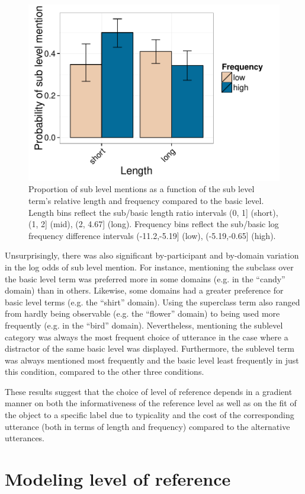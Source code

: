 \documentclass[10pt,letterpaper]{article}
\newcommand{\figref}[1]{Figure \ref{#1}}
\begin{document}
\begin{figure}[ht!]
\centering
\includegraphics[width=.5\textwidth]{graphs/freq-length-interaction}
\caption{Proportion of sub level mentions  as a function of the sub level term's relative length and frequency compared to the basic level. Length bins reflect the sub/basic length ratio intervals (0, 1] (short), (1, 2] (mid), (2, 4.67] (long). Frequency bins reflect the sub/basic log frequency difference intervals (-11.2,-5.19] (low), (-5.19,-0.65] (high).}
\label{fig:lengthfreqinteraction}
\end{figure}


Unsurprisingly, there was also significant by-participant and by-domain variation in the log odds of sub level mention. %
For instance, mentioning the subclass over the basic level term was preferred more in some domains (e.g. in the ``candy'' domain) than in others. Likewise, some domains had a greater preference for basic level terms (e.g. the ``shirt'' domain). Using the superclass term also ranged from hardly being observable (e.g. the ``flower'' domain) to being used more frequently (e.g. in the ``bird'' domain). Nevertheless, mentioning the sublevel category was always the most frequent choice of utterance in the case where a distractor of the same basic level was displayed. Furthermore, the sublevel term was always mentioned most frequently and the basic level least frequently in just this condition, compared to the other three conditions.



These results suggest that the choice of level of reference depends in a gradient manner on both the informativeness of the reference level as well as on the fit of the object to a specific label due to typicality and the cost of the corresponding utterance (both in terms of length and frequency) compared to the alternative utterances.




\section{\bf Modeling level of reference}
\end{document}
